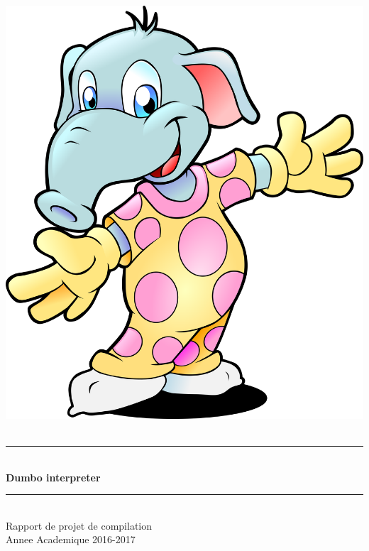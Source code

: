 \documentclass[10pt,a4paper]{article}
\newcommand{\HRule}{\rule{\linewidth}{0.5mm}}
\begin{document}
	\pagestyle{fancy}
	\fancyhf{}
	\cfoot{\thepage}
	
	\begin{titlepage}
		\begin{sffamily}
			\begin{center}
				\includegraphics[scale=0.25]{images/elephant.png}~\\[1.5cm]
				
				\HRule \\[0.5cm]
				{ \huge \bfseries Dumbo interpreter\\[0.4cm] }
				\HRule \\[1.5cm]
				
				\Large{Rapport de projet de compilation}\\[2cm]
				
				\Large{Annee Academique 2016-2017}\\[2cm]
				

\end{center}
\end{sffamily}
\end{titlepage}
\end{document}
